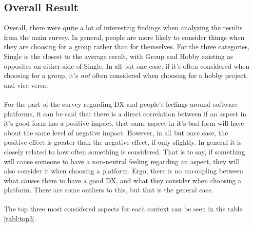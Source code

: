 \documentclass{cslthse-msc}
\begin{document}
    \subsection{Overall Result}
    Overall, there were quite a lot of interesting findings when analyzing the results from the main survey.
    In general, people are more likely to consider things when they are choosing for
    a group rather than for themselves. For the three categories, Single is the
    closest to the average result, with Group and Hobby existing as
    opposites on either side of Single. In all but one case, if it's often
    considered when choosing for a group, it's \textit{not} often considered when choosing
    for a hobby project, and vice versa.
    \\ \\
    For the part of the survey regarding DX and people's feelings around software platforms, it can be said that there is a direct correlation between if an aspect in it's good form has a positive impact, that same aspect in it's
    bad form will have about the same level of negative impact.
    However, in all but once case, the positive effect is greater than the negative
    effect, if only slightly. In general it is closely related to how often
    something is considered. That is to say, if something will cause someone to have a non-neutral feeling regarding an aspect, they will also consider it when choosing a platform. Ergo, there is no uncoupling between what causes them to have a good DX, and what they consider when choosing a platform. There are some
    outliers to this, but that is the general case.
    \\ \\
    The top three most considered aspects for each context can be seen in
    the table \ref{tabl:top3}.
\end{document}
